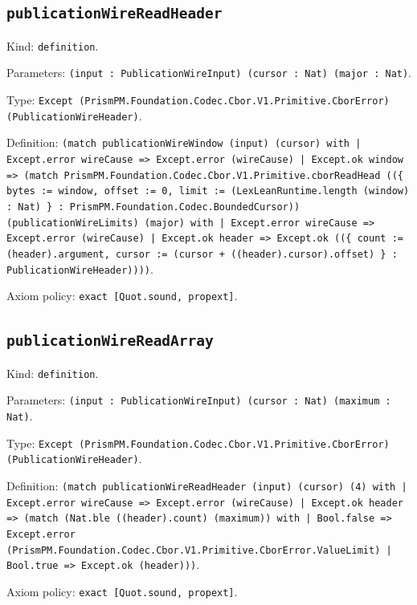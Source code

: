 \documentclass[11pt]{article}
\begin{document}
\subsection*{\texttt{publicationWireReadHeader}}
\noindent Kind: \texttt{definition}.\par
\noindent Parameters: \texttt{(input : PublicationWireInput) (cursor : Nat) (major : Nat)}.\par
\noindent Type: \texttt{Except (PrismPM.Foundation.Codec.Cbor.V1.Primitive.CborError) (PublicationWireHeader)}.\par
\noindent Definition: \texttt{(match publicationWireWindow (input) (cursor) with | Except.error wireCause => Except.error (wireCause) | Except.ok window => (match PrismPM.Foundation.Codec.Cbor.V1.Primitive.cborReadHead ((\{ bytes := window, offset := 0, limit := (LexLeanRuntime.length (window) : Nat) \} : PrismPM.Foundation.Codec.BoundedCursor)) (publicationWireLimits) (major) with | Except.error wireCause => Except.error (wireCause) | Except.ok header => Except.ok ((\{ count := (header).argument, cursor := (cursor + ((header).cursor).offset) \} : PublicationWireHeader))))}.\par
\noindent Axiom policy: \texttt{exact [Quot.sound, propext]}.\par
\subsection*{\texttt{publicationWireReadArray}}
\noindent Kind: \texttt{definition}.\par
\noindent Parameters: \texttt{(input : PublicationWireInput) (cursor : Nat) (maximum : Nat)}.\par
\noindent Type: \texttt{Except (PrismPM.Foundation.Codec.Cbor.V1.Primitive.CborError) (PublicationWireHeader)}.\par
\noindent Definition: \texttt{(match publicationWireReadHeader (input) (cursor) (4) with | Except.error wireCause => Except.error (wireCause) | Except.ok header => (match (Nat.ble ((header).count) (maximum)) with | Bool.false => Except.error (PrismPM.Foundation.Codec.Cbor.V1.Primitive.CborError.ValueLimit) | Bool.true => Except.ok (header)))}.\par
\noindent Axiom policy: \texttt{exact [Quot.sound, propext]}.\par
\end{document}
